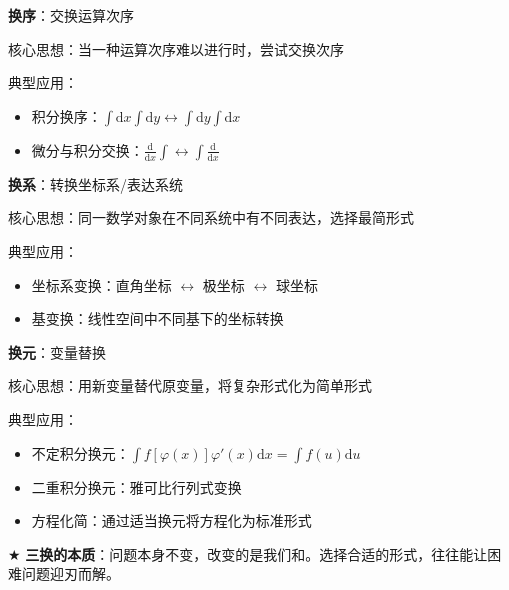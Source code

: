 \documentclass[../book.tex]{subfiles}
\begin{document}
    \begin{circlenum}
        \item \textbf{换序}：交换运算次序

            {\color{blue}核心思想}：当一种运算次序难以进行时，尝试交换次序

            {\color{blue}典型应用}：
        \begin{itemize}
            \item 积分换序：$\displaystyle\int\mathrm{d}x\int\mathrm{d}y \leftrightarrow \int\mathrm{d}y\int\mathrm{d}x$
            \item 微分与积分交换：$\displaystyle\frac{\mathrm{d}}{\mathrm{d}x}\int \leftrightarrow \int\frac{\mathrm{d}}{\mathrm{d}x}$
        \end{itemize}

        \item \textbf{换系}：转换坐标系/表达系统

            {\color{blue}核心思想}：同一数学对象在不同系统中有不同表达，选择最简形式

            {\color{blue}典型应用}：
        \begin{itemize}
            \item 坐标系变换：直角坐标 $\leftrightarrow$ 极坐标 $\leftrightarrow$ 球坐标
            \item 基变换：线性空间中不同基下的坐标转换
        \end{itemize}

        \item \textbf{换元}：变量替换

            {\color{blue}核心思想}：用新变量替代原变量，将复杂形式化为简单形式

            {\color{blue}典型应用}：
        \begin{itemize}
            \item 不定积分换元：$\displaystyle\int f[\varphi(x)]\varphi'(x)\mathrm{d}x = \int f(u)\mathrm{d}u$
            \item 二重积分换元：雅可比行列式变换
            \item 方程化简：通过适当换元将方程化为标准形式
        \end{itemize}
    \end{circlenum}

    \vspace{0.5em}
    {\color{red}$\bigstar$} \textbf{三换的本质}：问题本身不变，改变的是我们{\color{red}{观察问题的角度}}和{\color{red}{处理问题的工具}}。选择合适的形式，往往能让困难问题迎刃而解。
\end{document}
